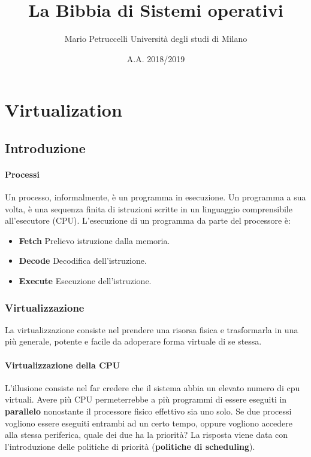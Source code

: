 \documentclass[12pt, letterpaper]{article}
\title{La Bibbia di Sistemi operativi}
\author{Mario Petruccelli \cr Università degli studi di Milano}
\date{A.A. 2018/2019}
\begin{document}
	\begin{titlepage} \maketitle \newpage \tableofcontents \end{titlepage}
	
	\section{Virtualization}
		
		\subsection{Introduzione}
		
			\paragraph{Processi} Un processo, informalmente, è un programma in esecuzione. Un programma a sua volta, è una sequenza finita di istruzioni scritte in un linguaggio comprensibile all'esecutore (CPU).
				L'esecuzione di un programma da parte del processore è:
				\begin{itemize}
					\item \textbf{Fetch} Prelievo istruzione dalla memoria.
					\item \textbf{Decode} Decodifica dell'istruzione.
					\item \textbf{Execute} Esecuzione dell'istruzione.
				\end{itemize}
			
			\subsubsection{Virtualizzazione} La virtualizzazione consiste nel prendere una risorsa fisica e trasformarla in una più generale, potente e facile da adoperare forma virtuale di se stessa. 
			
				\paragraph{Virtualizzazione della CPU} L'illusione consiste nel far credere che il sistema abbia un elevato numero di cpu virtuali. Avere più CPU permeterrebbe a più programmi di essere eseguiti in \textbf{parallelo} nonostante il processore fisico effettivo sia uno solo. Se due processi vogliono essere eseguiti entrambi ad un certo tempo, oppure vogliono accedere alla stessa periferica, quale dei due ha la priorità? La risposta viene data con l'introduzione delle politiche di priorità (\textbf{politiche di scheduling}).
			
\end{document}
